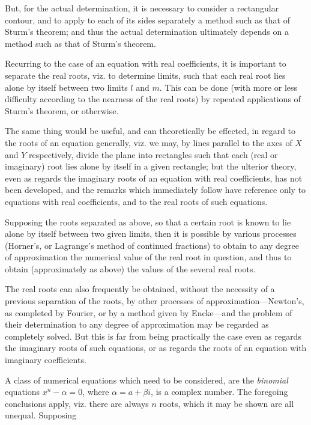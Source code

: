 \documentclass[12pt,a4paper]{article}
\begin{document}
But, for the actual determination, it is necessary to consider a rectangular contour, and to apply to each of its sides separately a method such as that of Sturm's theorem; and thus the actual determination ultimately depends on a method such as that of Sturm's theorem.

Recurring to the case of an equation with real coefficients, it is important to separate the real roots, viz. to determine limits, such that each real root lies alone by itself between two limits $l$ and $m$. This can be done (with more or less difficulty according to the nearness of the real roots) by repeated applications of Sturm's theorem, or otherwise.

The same thing would be useful, and can theoretically be effected, in regard to the roots of an equation generally, viz. we may, by lines parallel to the axes of $X$ and $Y$ respectively, divide the plane into rectangles such that each (real or imaginary) root lies alone by itself in a given rectangle; but the ulterior theory, even as regards the imaginary roots of an equation with real coefficients, has not been developed, and the remarks which immediately follow have reference only to equations with real coefficients, and to the real roots of such equations.

Supposing the roots separated as above, so that a certain root is known to lie alone by itself between two given limits, then it is possible by various processes (Horner's, or Lagrange's method of continued fractions) to obtain to any degree of approximation the numerical value of the real root in question, and thus to obtain (approximately as above) the values of the several real roots.

The real roots can also frequently be obtained, without the necessity of a previous separation of the roots, by other processes of approximation---Newton's, as completed by Fourier, or by a method given by Encke---and the problem of their determination to any degree of approximation may be regarded as completely solved. But this is far from being practically the case even as regards the imaginary roots of such equations, or as regards the roots of an equation with imaginary coefficients.

A class of numerical equations which need to be considered, are the \textit{binomial} equations $x^n - \alpha = 0$, where $\alpha = a + \beta i$, is a complex number. The foregoing conclusions apply, viz. there are always $n$ roots, which it may be shown are all unequal. Supposing
\end{document}
